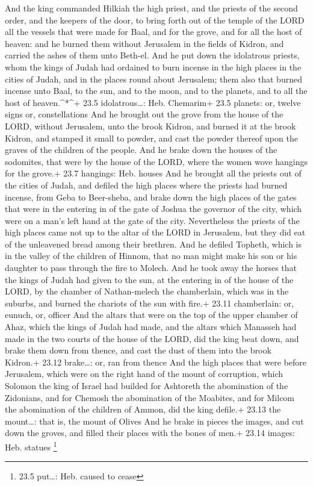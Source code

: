  And the king commanded Hilkiah the high priest, and the
priests of the second order, and the keepers of the door, to bring forth
out of the temple of the LORD all the vessels that were made for Baal,
and for the grove, and for all the host of heaven: and he burned them
without Jerusalem in the fields of Kidron, and carried the ashes of them
unto Beth-el.  And he put down the idolatrous priests, whom
the kings of Judah had ordained to burn incense in the high places in
the cities of Judah, and in the places round about Jerusalem; them also
that burned incense unto Baal, to the sun, and to the moon, and to the
planets, and to all the host of heaven.\^{}*\^{}+ 23.5 idolatrous\ldots:
Heb. Chemarim+ 23.5 planets: or, twelve signs or, constellations
 And he brought out the grove from the house of the LORD,
without Jerusalem, unto the brook Kidron, and burned it at the brook
Kidron, and stamped it small to powder, and cast the powder thereof upon
the graves of the children of the people.  And he brake down
the houses of the sodomites, that were by the house of the LORD, where
the women wove hangings for the grove.+ 23.7 hangings: Heb. houses
 And he brought all the priests out of the cities of Judah,
and defiled the high places where the priests had burned incense, from
Geba to Beer-sheba, and brake down the high places of the gates that
were in the entering in of the gate of Joshua the governor of the city,
which were on a man's left hand at the gate of the city. 
Nevertheless the priests of the high places came not up to the altar of
the LORD in Jerusalem, but they did eat of the unleavened bread among
their brethren.  And he defiled Topheth, which is in the
valley of the children of Hinnom, that no man might make his son or his
daughter to pass through the fire to Molech.  And he took
away the horses that the kings of Judah had given to the sun, at the
entering in of the house of the LORD, by the chamber of Nathan-melech
the chamberlain, which was in the suburbs, and burned the chariots of
the sun with fire.+ 23.11 chamberlain: or, eunuch, or, officer
 And the altars that were on the top of the upper chamber
of Ahaz, which the kings of Judah had made, and the altars which
Manasseh had made in the two courts of the house of the LORD, did the
king beat down, and brake them down from thence, and cast the dust of
them into the brook Kidron.+ 23.12 brake\ldots: or, ran from thence
 And the high places that were before Jerusalem, which were
on the right hand of the mount of corruption, which Solomon the king of
Israel had builded for Ashtoreth the abomination of the Zidonians, and
for Chemosh the abomination of the Moabites, and for Milcom the
abomination of the children of Ammon, did the king defile.+ 23.13 the
mount\ldots: that is, the mount of Olives  And he brake in
pieces the images, and cut down the groves, and filled their places with
the bones of men.+ 23.14 images: Heb. statues \footnote{23.5 put\ldots:
  Heb. caused to cease}

